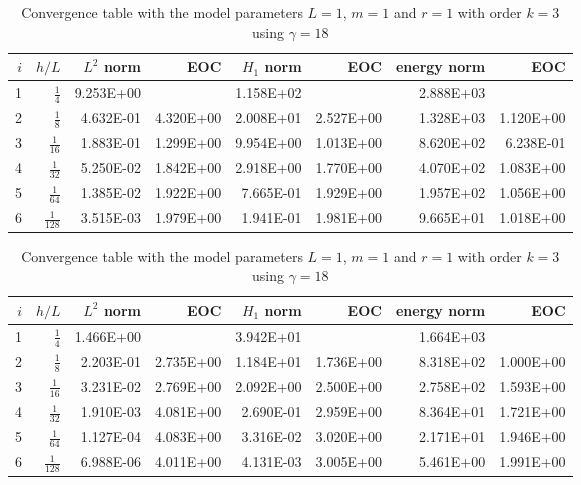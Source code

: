 \begin{table}
  \caption{\label{tab:ex1_order:a} Convergence table with the model parameters $L=1$, $m=1$ and $r=1$ with order $k=2$ using $ \gamma = 9$.}
  \begin{tabular}{rrrrrrrr}
    \hline\hline
    $i$&\textbf{$h/{L} $} & \textbf{$L^2$ norm} & \textbf{EOC} & \textbf{$H_1$ norm} & \textbf{EOC} & \textbf{energy norm} & \textbf{EOC} \\\hline
    1&$\frac{1}{4}$ & 9.253E+00 &  & 1.158E+02 &  & 2.888E+03 &  \\
    2&$\frac{1}{8}$ & 4.632E-01 & 4.320E+00 & 2.008E+01 & 2.527E+00 & 1.328E+03 & 1.120E+00 \\
    3&$\frac{1}{16}$ & 1.883E-01 & 1.299E+00 & 9.954E+00 & 1.013E+00 & 8.620E+02 & 6.238E-01 \\
    4&$\frac{1}{32}$ & 5.250E-02 & 1.842E+00 & 2.918E+00 & 1.770E+00 & 4.070E+02 & 1.083E+00 \\
    5&$\frac{1}{64}$ & 1.385E-02 & 1.922E+00 & 7.665E-01 & 1.929E+00 & 1.957E+02 & 1.056E+00 \\
    6&$\frac{1}{128}$ & 3.515E-03 & 1.979E+00 & 1.941E-01 & 1.981E+00 & 9.665E+01 & 1.018E+00 \\\hline\hline
  \end{tabular}
  \caption{\label{tab:ex1_order:b} Convergence table with the model parameters $L=1$, $m=1$ and $r=1$ with order $k=3$ using $ \gamma = 18$ }
  \begin{tabular}{rrrrrrrr}
    \hline\hline
    $i$&\textbf{$h/{L} $} & \textbf{$L^2$ norm} & \textbf{EOC} & \textbf{$H_1$ norm} & \textbf{EOC} & \textbf{energy norm} & \textbf{EOC} \\\hline
    1&$\frac{1}{4}$ & 1.466E+00 &  & 3.942E+01 &  & 1.664E+03 &  \\
    2&$\frac{1}{8}$ & 2.203E-01 & 2.735E+00 & 1.184E+01 & 1.736E+00 & 8.318E+02 & 1.000E+00 \\
    3&$\frac{1}{16}$ & 3.231E-02 & 2.769E+00 & 2.092E+00 & 2.500E+00 & 2.758E+02 & 1.593E+00 \\
    4&$\frac{1}{32}$ & 1.910E-03 & 4.081E+00 & 2.690E-01 & 2.959E+00 & 8.364E+01 & 1.721E+00 \\
    5&$\frac{1}{64}$ & 1.127E-04 & 4.083E+00 & 3.316E-02 & 3.020E+00 & 2.171E+01 & 1.946E+00 \\
    6&$\frac{1}{128}$ & 6.988E-06 & 4.011E+00 & 4.131E-03 & 3.005E+00 & 5.461E+00 & 1.991E+00 \\\hline\hline
  \end{tabular}


\end{table}

